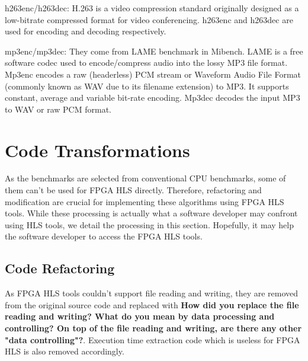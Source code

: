 \documentclass[conference]{IEEEtran}
\begin{document}
h263enc/h263dec: H.263 is a video compression standard originally designed as a low-bitrate compressed format for video conferencing. h263enc and h263dec are used for encoding and decoding respectively.

mp3enc/mp3dec: They come from LAME benchmark in Mibench. LAME is a free software codec used to encode/compress audio into the lossy MP3 file format. 
Mp3enc encodes a raw (headerless) PCM stream or Waveform Audio File Format (commonly known as WAV due to its filename extension) to MP3. It supports constant, average and variable bit-rate encoding. Mp3dec decodes the input MP3 to WAV or raw PCM format.

\section{Code Transformations}\label{section_code_transforming}
As the benchmarks are selected from conventional CPU benchmarks, some of them can't be used for FPGA HLS directly. Therefore, refactoring and modification are crucial for implementing these algorithms using FPGA HLS tools. While these processing is actually what a software developer may confront using HLS tools, we detail the processing in this section. Hopefully, it may help the software developer to access the FPGA HLS tools.

\subsection{Code Refactoring}
As FPGA HLS tools couldn't support file reading and writing, they are removed from the original source code and replaced with \textbf{How did you replace the file reading and writing? What do you mean by data processing and controlling? On top of the file reading and writing, are there any other "data controlling"?}. Execution time extraction code which is useless for FPGA HLS is also removed accordingly.
\end{document}
